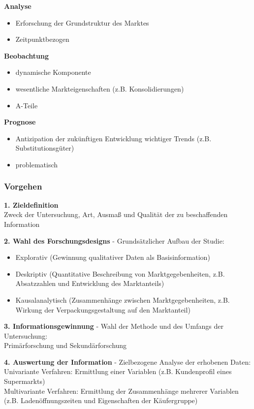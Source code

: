 \documentclass[a4paper,11pt, twoside]{article}
\newcommand\mpar[1]{\marginpar {\flushleft\small #1}}
\begin{document}
\textbf{Analyse}
\begin{itemize}
	\item Erforschung der Grundstruktur des Marktes
	\item Zeitpunktbezogen 
\end{itemize}

\textbf{Beobachtung}
\begin{itemize}
	\item dynamische Komponente
	\item wesentliche Markteigenschaften (z.B. Konsolidierungen)
	\item A-Teile 
\end{itemize}

\textbf{Prognose}
\begin{itemize}
	\item Antizipation der zukünftigen Entwicklung wichtiger Trends (z.B. Substitutionsgüter)
	\item problematisch
\end{itemize}

\subsubsection*{Vorgehen}
\textbf{1. Zieldefinition}\\
Zweck der Untersuchung, Art, Ausmaß und Qualität der zu beschaffenden Information

\textbf{2. Wahl des Forschungsdesigns} - Grundsätzlicher Aufbau der Studie:
\begin{itemize}
	\item Explorativ (Gewinnung qualitativer Daten als Basisinformation)
\mpar{\textcolor{red}{Beispiel: "`Welche Eigenschaften muß eine Kaffeesorte für ältere Menschen aufweisen?"'}}
	\item Deskriptiv (Quantitative Beschreibung von Marktgegebenheiten, z.B. Absatzzahlen und Entwicklung des Marktanteils)
	\item Kausalanalytisch (Zusammenhänge zwischen Marktgegebenheiten, z.B. Wirkung der Verpackungsgestaltung auf den Marktanteil)
\end{itemize}

\textbf{3. Informationsgewinnung} - Wahl der Methode und des Umfangs der Untersuchung:\\
Primärforschung und Sekundärforschung

\textbf{4. Auswertung der Information} - Zielbezogene Analyse der erhobenen Daten:\\
Univariante Verfahren: Ermittlung einer Variablen (z.B. Kundenprofil eines Supermarkts)\\
Multivariante Verfahren: Ermittlung der Zusammenhänge mehrerer Variablen (z.B. Ladenöffnungszeiten und Eigenschaften der Käufergruppe)
\end{document}
